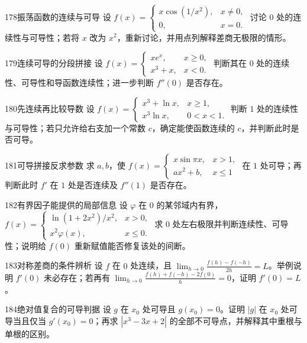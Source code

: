 \begin{exercise}{178}{振荡函数的连续与可导}
设 $f(x)=\begin{cases}x\cos(1/x^2),&x\ne0,\\0,&x=0.\end{cases}$ 讨论 $0$ 处的连续性与可导性；若将 $x$ 改为 $x^2$，重新讨论，并用点列解释差商无极限的情形。
\end{exercise}
\begin{exercise}{179}{连续可导的分段拼接}
设 $f(x)=\begin{cases}xe^x,&x\ge0,\\x^3+x,&x<0.\end{cases}$ 判断其在 $0$ 处的连续性、可导性和导函数连续性；进一步判断 $f''(0)$ 是否存在。
\end{exercise}
\begin{exercise}{180}{先连续再比较导数}
设 $f(x)=\begin{cases}x^3+\ln x,&x\ge1,\\x^3\ln x,&0<x<1.\end{cases}$ 判断 $1$ 处的连续性与可导性；若只允许给右支加一个常数 $c$，确定能使函数连续的 $c$，并判断此时是否可导。
\end{exercise}
\begin{exercise}{181}{可导拼接反求参数}
求 $a,b$，使 $f(x)=\begin{cases}x\sin\pi x,&x>1,\\ax^2+b,&x\le1\end{cases}$ 在 $1$ 处可导；再判断此时 $f'$ 在 $1$ 处是否连续及 $f''(1)$ 是否存在。
\end{exercise}
\begin{exercise}{182}{有界因子能提供的局部信息}
设 $\varphi$ 在 $0$ 的某邻域内有界，$f(x)=\begin{cases}\ln(1+2x^2)/x^2,&x>0,\\x^2\varphi(x),&x\le0.\end{cases}$ 求 $0$ 处左右极限并判断连续性、可导性；说明给 $f(0)$ 重新赋值能否修复该处的间断。
\end{exercise}
\begin{exercise}{183}{对称差商的条件辨析}
设 $f$ 在 $0$ 处连续，且 $\lim_{h\to0}\frac{f(h)-f(-h)}{2h}=L$。举例说明 $f'(0)$ 未必存在；若再有 $\lim_{h\to0}\frac{f(h)+f(-h)-2f(0)}h=0$，证明 $f'(0)=L$。
\end{exercise}
\begin{exercise}{184}{绝对值复合的可导判据}
设 $g$ 在 $x_0$ 处可导且 $g(x_0)=0$。证明 $|g|$ 在 $x_0$ 处可导当且仅当 $g'(x_0)=0$；再求 $|x^3-3x+2|$ 的全部不可导点，并解释其中重根与单根的区别。
\end{exercise}
